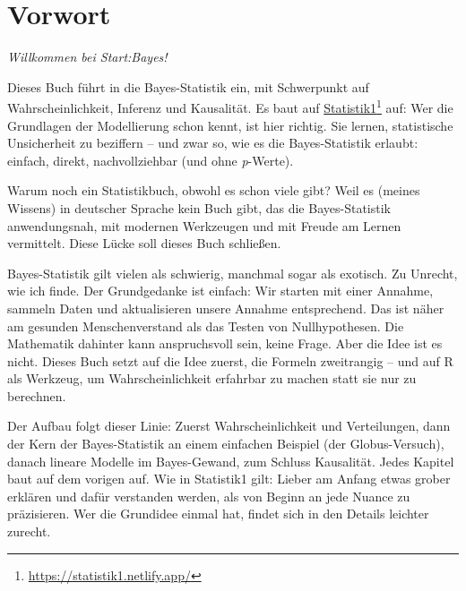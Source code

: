 \documentclass[
  ngerman,
  letterpaper,
  twoside,
  open=any]{scrbook}
\theoremstyle{definition}
\theoremstyle{plain}
\theoremstyle{definition}
\theoremstyle{definition}
\theoremstyle{remark}
\begin{document}


\mainmatter
{}

\chapter*{Vorwort}\label{vorwort}


\setcounter{page}{7}

\emph{Willkommen bei Start:Bayes!}

Dieses Buch führt in die Bayes-Statistik ein, mit Schwerpunkt auf
Wahrscheinlichkeit, Inferenz und Kausalität. Es baut auf
\href{https://statistik1.netlify.app/}{Statistik1}\footnote{\url{https://statistik1.netlify.app/}}
auf: Wer die Grundlagen der Modellierung schon kennt, ist hier richtig.
Sie lernen, statistische Unsicherheit zu beziffern -- und zwar so, wie
es die Bayes-Statistik erlaubt: einfach, direkt, nachvollziehbar (und
ohne \emph{p}-Werte).

Warum noch ein Statistikbuch, obwohl es schon viele gibt? Weil es
(meines Wissens) in deutscher Sprache kein Buch gibt, das die
Bayes-Statistik anwendungsnah, mit modernen Werkzeugen und mit Freude am
Lernen vermittelt. Diese Lücke soll dieses Buch schließen.

Bayes-Statistik gilt vielen als schwierig, manchmal sogar als exotisch.
Zu Unrecht, wie ich finde. Der Grundgedanke ist einfach: Wir starten mit
einer Annahme, sammeln Daten und aktualisieren unsere Annahme
entsprechend. Das ist näher am gesunden Menschenverstand als das Testen
von Nullhypothesen. Die Mathematik dahinter kann anspruchsvoll sein,
keine Frage. Aber die Idee ist es nicht. Dieses Buch setzt auf die Idee
zuerst, die Formeln zweitrangig -- und auf R als Werkzeug, um
Wahrscheinlichkeit erfahrbar zu machen statt sie nur zu berechnen.

Der Aufbau folgt dieser Linie: Zuerst Wahrscheinlichkeit und
Verteilungen, dann der Kern der Bayes-Statistik an einem einfachen
Beispiel (der Globus-Versuch), danach lineare Modelle im Bayes-Gewand,
zum Schluss Kausalität. Jedes Kapitel baut auf dem vorigen auf. Wie in
Statistik1 gilt: Lieber am Anfang etwas grober erklären und dafür
verstanden werden, als von Beginn an jede Nuance zu präzisieren. Wer die
Grundidee einmal hat, findet sich in den Details leichter zurecht.
\end{document}
